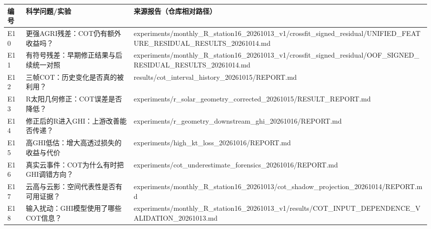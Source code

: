 \documentclass[UTF8,a4paper,landscape,10pt]{ctexart}
\begin{document}
\begin{center}\small
\begin{adjustbox}{max totalheight=0.58\textheight,max width=\linewidth}
\begin{minipage}{\linewidth}\begin{tabularx}{\linewidth}{>{\hsize=0.3000\hsize\raggedright\arraybackslash}X>{\hsize=0.9000\hsize\raggedright\arraybackslash}X>{\hsize=1.8000\hsize\raggedright\arraybackslash}X}\toprule
\textbf{编号} & \textbf{科学问题/\allowbreak{}实验} & \textbf{来源报告（仓库相对路径）} \\ \midrule
E10 & 更强AGRI残差：COT仍有额外收益吗？ & experiments/\allowbreak{}monthly\_\allowbreak{}R\_\allowbreak{}station16\_\allowbreak{}20261013\_\allowbreak{}v1/\allowbreak{}crossfit\_\allowbreak{}signed\_\allowbreak{}residual/\allowbreak{}UNIFIED\_\allowbreak{}FEATURE\_\allowbreak{}RESIDUAL\_\allowbreak{}RESULTS\_\allowbreak{}20261014.md \\
E11 & 有符号残差：早期修正结果与后续统一对照 & experiments/\allowbreak{}monthly\_\allowbreak{}R\_\allowbreak{}station16\_\allowbreak{}20261013\_\allowbreak{}v1/\allowbreak{}crossfit\_\allowbreak{}signed\_\allowbreak{}residual/\allowbreak{}OOF\_\allowbreak{}SIGNED\_\allowbreak{}RESIDUAL\_\allowbreak{}RESULTS\_\allowbreak{}20261014.md \\
E12 & 三帧COT：历史变化是否真的被利用？ & results/\allowbreak{}cot\_\allowbreak{}interval\_\allowbreak{}history\_\allowbreak{}20261015/\allowbreak{}REPORT.md \\
E13 & R太阳几何修正：COT误差是否降低？ & experiments/\allowbreak{}r\_\allowbreak{}solar\_\allowbreak{}geometry\_\allowbreak{}corrected\_\allowbreak{}20261015/\allowbreak{}RESULT\_\allowbreak{}REPORT.md \\
E14 & 修正后的R进入GHI：上游改善能否传递？ & experiments/\allowbreak{}r\_\allowbreak{}geometry\_\allowbreak{}downstream\_\allowbreak{}ghi\_\allowbreak{}20261016/\allowbreak{}REPORT.md \\
E15 & 高GHI低估：增大高透过损失的收益与代价 & experiments/\allowbreak{}high\_\allowbreak{}kt\_\allowbreak{}loss\_\allowbreak{}20261016/\allowbreak{}REPORT.md \\
E16 & 真实云事件：COT为什么有时把GHI调错方向？ & experiments/\allowbreak{}cot\_\allowbreak{}underestimate\_\allowbreak{}forensics\_\allowbreak{}20261016/\allowbreak{}REPORT.md \\
E17 & 云高与云影：空间代表性是否有可用证据？ & experiments/\allowbreak{}monthly\_\allowbreak{}R\_\allowbreak{}station16\_\allowbreak{}20261013/\allowbreak{}cot\_\allowbreak{}shadow\_\allowbreak{}projection\_\allowbreak{}20261014/\allowbreak{}REPORT.md \\
E18 & 输入扰动：GHI模型使用了哪些COT信息？ & experiments/\allowbreak{}monthly\_\allowbreak{}R\_\allowbreak{}station16\_\allowbreak{}20261013\_\allowbreak{}v1/\allowbreak{}results/\allowbreak{}COT\_\allowbreak{}INPUT\_\allowbreak{}DEPENDENCE\_\allowbreak{}VALIDATION\_\allowbreak{}20261013.md \\
\bottomrule\end{tabularx}\end{minipage}\end{adjustbox}\end{center}
\end{document}
